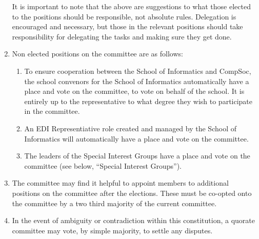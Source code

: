 \begin{enumerate}
  It is important to note that the above are suggestions to what those elected to the positions should be responsible, not absolute rules. Delegation is encouraged and necessary, but those in the relevant positions should take responsibility for delegating the tasks and making sure they get done.

\item Non elected positions on the committee are as follows:
  \begin{enumerate}
  \item To ensure cooperation between the School of Informatics and CompSoc, the school convenors for the School of Informatics automatically have a place and vote on the committee, to vote on behalf of the school. It is entirely up to the representative to what degree they wish to participate in the committee.
  \item An EDI Representiative role created and managed by the School of Informatics will automatically have a place and vote on the committee.
  \item The leaders of the Special Interest Groups have a place and vote on the committee (see below, \enquote{Special Interest Groups}).
  \end{enumerate}

\item The committee may find it helpful to appoint members to additional positions on the committee after the elections. These must be co-opted onto the committee by a two third majority of the current committee.

\item In the event of ambiguity or contradiction within this constitution, a quorate committee may vote, by simple majority, to settle any disputes.

\end{enumerate}

